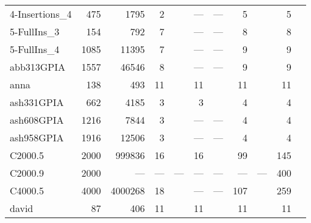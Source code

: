 \begin{longtable}{lrrrlrlrlrl}
  4-Insertions\_4 & 475 & 1795 & 2 & \cite{Malaguti2011} & --- & --- & 5 & \cite{Malaguti2010} & 5 & \cite{Malaguti2010,Mendez-Diaz2006,Malaguti2011,Gualandi2012,Brelaz1979,Sewell1996,Segundo2012} \\ 
  5-FullIns\_3 & 154 & 792 & 7 & \cite{Malaguti2011} & --- & --- & 8 & \cite{Mendez-Diaz2006,Malaguti2011,Gualandi2012} & 8 & \cite{Mendez-Diaz2006,Malaguti2011,Gualandi2012,Brelaz1979,Sewell1996,Segundo2012} \\ 
  5-FullIns\_4 & 1085 & 11395 & 7 & \cite{us} & --- & --- & 9 & \cite{Malaguti2010} & 9 & \cite{Mendez-Diaz2006,Malaguti2011,Gualandi2012,Mendez-Diaz2006,Brelaz1979,Sewell1996,Segundo2012} \\ 
  abb313GPIA & 1557 & 46546 & 8 & \cite{Held2011} & --- & --- & 9 & \cite{Gliesch2021} & 9 & \cite{Malaguti2011} \\ 
  anna & 138 & 493 & 11 & \cite{Gualandi2012} & 11 & \cite{Gualandi2012} & 11 & \cite{Mehrotra1996,Malaguti2011,Gualandi2012,Mendez-Diaz2006} & 11 & \cite{Mehrotra1996,Malaguti2011,Wu2013a,Gualandi2012,Mendez-Diaz2006,Brelaz1979,Sewell1996,Segundo2012} \\ 
  ash331GPIA & 662 & 4185 & 3 & \cite{Malaguti2011} & 3 & \cite{Gualandi2012} & 4 & \cite{Mendez-Diaz2006,Malaguti2011,Gualandi2012} & 4 & \cite{Mendez-Diaz2006,Malaguti2011,Gualandi2012,Brelaz1979,Sewell1996,Segundo2012} \\ 
  ash608GPIA & 1216 & 7844 & 3 & \cite{Malaguti2011} & --- & --- & 4 & \cite{Mendez-Diaz2006,Malaguti2011} & 4 & \cite{Mendez-Diaz2006,Malaguti2011,Brelaz1979,Sewell1996,Segundo2012} \\ 
  ash958GPIA & 1916 & 12506 & 3 & \cite{Malaguti2011} & --- & --- & 4 & \cite{Mendez-Diaz2006,Mendez-Diaz2008} & 4 & \cite{Malaguti2011,Segundo2012} \\ 
  C2000.5 & 2000 & 999836 & 16 & \cite{Held2011} & 16 & \cite{Held2011} & 99 & \cite{Held2011} & 145 & \cite{Hao2012,Titiloye2012} \\ 
  C2000.9 & 2000 & --- & --- & --- & --- & --- & --- & --- & 400 & \cite{Titiloye2012} \\ 
  C4000.5 & 4000 & 4000268 & 18 & \cite{us} & --- & --- & 107 & \cite{Held2011} & 259 & \cite{Hao2012,Titiloye2012} \\ 
  david & 87 & 406 & 11 & \cite{Malaguti2011} & 11 & \cite{Gualandi2012} & 11 & \cite{Mehrotra1996,Malaguti2011,Gualandi2012,Mendez-Diaz2006} & 11 & \cite{Mehrotra1996,Malaguti2011,Wu2013a,Gualandi2012,Mendez-Diaz2006,Brelaz1979,Sewell1996,Segundo2012} \\ 

\end{longtable}
